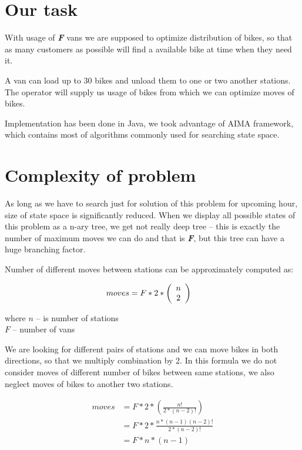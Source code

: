 \documentclass[11pt,twoside,a4paper]{mr}%
\begin{document}
\section{Our task}
With usage of \textbf{\textsl{F}} vans we are supposed to optimize distribution of bikes, so that as many customers as possible will find a available bike at time when they need it.

A van can load up to 30 bikes and unload them to one or two another stations. The operator will supply us usage of bikes from which we can optimize moves of bikes. 

Implementation has been done in Java, we took advantage of AIMA framework\cite{aima}, which contains most of algorithms commonly used for searching state space.

\section{Complexity of problem}
As long as we have to search just for solution of this problem for upcoming hour, size of state space is significantly reduced. When we display all possible states of this problem as a n-ary tree, we get not really deep tree -- this is exactly the number of maximum moves we can do and that is \textbf{\textsl{F}}, but this tree can have a huge branching factor. 

Number of different moves between stations can be approximately computed as:

\begin{align}
 moves &= F * 2 * \left( {\begin{array}{*{20}c}
n \\
2 \\
\end{array}} \right)
\end{align}

\begin{tabbing}
where     \= \(n\) -- is number of stations\\
	\> \(F\) -- number of vans
 \end{tabbing}

We are looking for different pairs of stations and we can move bikes in both directions, so that we multiply combination by 2. In this formula we do not consider moves of different number of bikes between same stations, we also neglect moves of bikes to another two stations. 

\begin{align*}
 moves &= F * 2 * \left( \frac{n!}{2* (n-2)!} \right) \\
       &= F * 2 * \frac{n*(n-1)(n-2)!}{2*(n-2)!} \\
       &= F * n * (n-1) 
\end{align*} 
\end{document}
